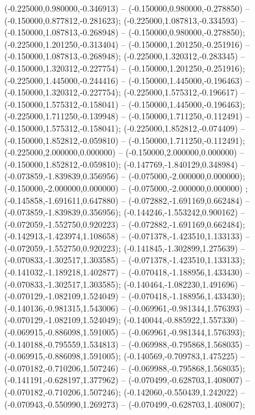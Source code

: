  (-0.225000,0.980000,-0.346913) -- (-0.150000,0.980000,-0.278850) -- (-0.150000,0.877812,-0.281623);
 (-0.225000,1.087813,-0.334593) -- (-0.150000,1.087813,-0.268948) -- (-0.150000,0.980000,-0.278850);
 (-0.225000,1.201250,-0.313404) -- (-0.150000,1.201250,-0.251916) -- (-0.150000,1.087813,-0.268948);
 (-0.225000,1.320312,-0.283345) -- (-0.150000,1.320312,-0.227754) -- (-0.150000,1.201250,-0.251916);
 (-0.225000,1.445000,-0.244416) -- (-0.150000,1.445000,-0.196463) -- (-0.150000,1.320312,-0.227754);
 (-0.225000,1.575312,-0.196617) -- (-0.150000,1.575312,-0.158041) -- (-0.150000,1.445000,-0.196463);
 (-0.225000,1.711250,-0.139948) -- (-0.150000,1.711250,-0.112491) -- (-0.150000,1.575312,-0.158041);
 (-0.225000,1.852812,-0.074409) -- (-0.150000,1.852812,-0.059810) -- (-0.150000,1.711250,-0.112491);
 (-0.225000,2.000000,0.000000) -- (-0.150000,2.000000,0.000000) -- (-0.150000,1.852812,-0.059810);
 (-0.147769,-1.840129,0.348984) -- (-0.073859,-1.839839,0.356956) -- (-0.075000,-2.000000,0.000000);
 (-0.150000,-2.000000,0.000000) -- (-0.075000,-2.000000,0.000000) ;
 (-0.145858,-1.691611,0.647880) -- (-0.072882,-1.691169,0.662484) -- (-0.073859,-1.839839,0.356956);
 (-0.144246,-1.553242,0.900162) -- (-0.072059,-1.552750,0.920223) -- (-0.072882,-1.691169,0.662484);
 (-0.142913,-1.423974,1.108658) -- (-0.071378,-1.423510,1.133133) -- (-0.072059,-1.552750,0.920223);
 (-0.141845,-1.302899,1.275639) -- (-0.070833,-1.302517,1.303585) -- (-0.071378,-1.423510,1.133133);
 (-0.141032,-1.189218,1.402877) -- (-0.070418,-1.188956,1.433430) -- (-0.070833,-1.302517,1.303585);
 (-0.140464,-1.082230,1.491696) -- (-0.070129,-1.082109,1.524049) -- (-0.070418,-1.188956,1.433430);
 (-0.140136,-0.981315,1.543006) -- (-0.069961,-0.981344,1.576393) -- (-0.070129,-1.082109,1.524049);
 (-0.140044,-0.885922,1.557330) -- (-0.069915,-0.886098,1.591005) -- (-0.069961,-0.981344,1.576393);
 (-0.140188,-0.795559,1.534813) -- (-0.069988,-0.795868,1.568035) -- (-0.069915,-0.886098,1.591005);
 (-0.140569,-0.709783,1.475225) -- (-0.070182,-0.710206,1.507246) -- (-0.069988,-0.795868,1.568035);
 (-0.141191,-0.628197,1.377962) -- (-0.070499,-0.628703,1.408007) -- (-0.070182,-0.710206,1.507246);
 (-0.142060,-0.550439,1.242022) -- (-0.070943,-0.550990,1.269273) -- (-0.070499,-0.628703,1.408007);

